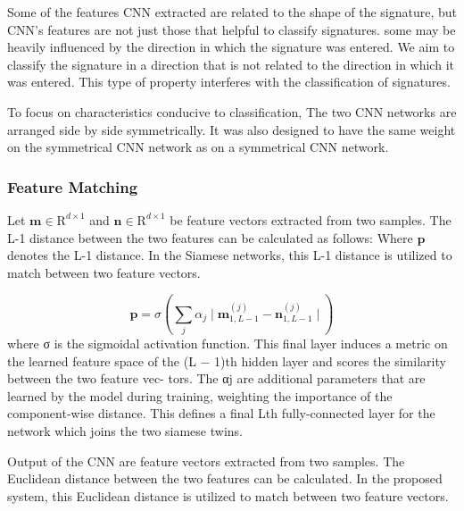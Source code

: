 \documentclass[runningheads]{llncs}
\begin{document}
Some of the features CNN extracted are related to the shape of the signature, but CNN's features are not just those that helpful to classify signatures. some may be heavily influenced by the direction in which the signature was entered.
We aim to classify the signature in a direction that is not related to the direction in which it was entered. This type of property interferes with the classification of signatures.

To focus on characteristics conducive to classification, The two CNN networks are arranged side by side symmetrically.
It was also designed to have the same weight on the symmetrical CNN network as on a symmetrical CNN network. 






\subsubsection{Feature Matching}

Let $\mathbf{m}\in{\mathrm{R}}^{d\times1}$ and $\mathbf{n}\in{\mathrm{R}}^{d\times1}$ be feature vectors extracted from two samples.
The L-1 distance between the two features can be calculated as  follows:
Where $\mathbf{p}$ denotes the L-1 distance. In the Siamese networks, this L-1 distance is utilized to match between two feature vectors.

\begin{equation}
    \mathbf{p} = 
    \sigma(\sum_j\alpha_{j}\mid
    \mathbf{m}_{1,L-1}^{(j)} - 
    \mathbf{n}_{1,L-1}^{(j)}\mid)  
\end{equation}
where σ is the sigmoidal
activation function. This final layer induces a metric on the learned feature space of the (L − 1)th hidden layer and scores the similarity between the two feature vec- tors. The αj are additional parameters that are learned by the model during training, weighting the importance of the component-wise distance. This defines a final Lth fully-connected layer for the network which joins the two siamese twins.



Output of the CNN are feature vectors extracted from two samples. The Euclidean distance between the two features can be calculated.
In the proposed system, this Euclidean distance is utilized to match between two feature vectors.
\end{document}

